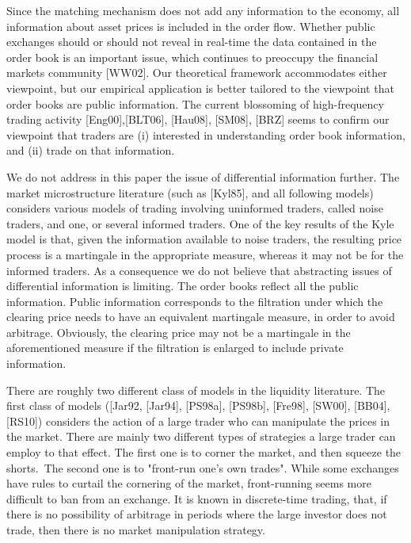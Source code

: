 \documentclass{article}
\begin{document}
Since the matching mechanism does not add any information to the economy,
all information about asset prices is included in the order flow. Whether
public exchanges should or should not reveal in real-time the data contained
in the order book is an important issue, which continues to preoccupy the
financial markets community [WW02]. Our theoretical framework accommodates
either viewpoint, but our empirical application is better tailored to the
viewpoint that order books are public information. The current blossoming of
high-frequency trading activity [Eng00],[BLT06], [Hau08], [SM08], [BRZ]
seems to confirm our viewpoint that traders are (i) interested in
understanding order book information, and (ii) trade on that information.

We do not address in this paper the issue of differential information
further. The market microstructure literature (such as [Kyl85], and all
following models) considers various models of trading involving uninformed
traders, called noise traders, and one, or several informed traders. One of
the key results of the Kyle model is that, given the information available
to noise traders, the resulting price process is a martingale in the
appropriate measure, whereas it may not be for the informed traders. As a
consequence we do not believe that abstracting issues of differential
information is limiting. The order books reflect all the public information.
Public information corresponds to the filtration under which the clearing
price needs to have an equivalent martingale measure, in order to avoid
arbitrage. Obviously, the clearing price may not be a martingale in the
aforementioned measure if the filtration is enlarged to include private
information.

There are roughly two different class of models in the liquidity literature.
The first class of models ([Jar92, [Jar94], [PS98a], [PS98b], [Fre98],
[SW00], [BB04], [RS10]) considers the action of a large trader who can
manipulate the prices in the market. There are mainly two different types of
strategies a large trader can employ to that effect. The first one is to
corner the market, and then squeeze the shorts.\ The second one is to
"front-run one's own trades". While some exchanges have rules to curtail the
cornering of the market, front-running seems more difficult to ban from an
exchange. It is known in discrete-time trading, that, if there is no
possibility of arbitrage in periods where the large investor does not trade,
then there is no market manipulation strategy.
\end{document}
